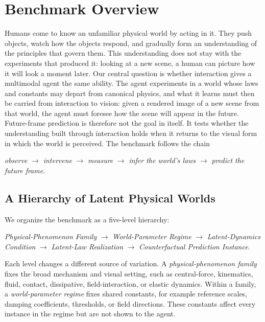 \section{Benchmark Overview}
\label{sec:benchmark}

Humans come to know an unfamiliar physical world by acting in it. They push objects, watch how the objects respond, and gradually form an understanding of the principles that govern them. This understanding does not stay with the experiments that produced it: looking at a new scene, a human can picture how it will look a moment later. Our central question is whether interaction gives a multimodal agent the same ability. The agent experiments in a world whose laws and constants may depart from canonical physics, and what it learns must then be carried from interaction to vision: given a rendered image of a new scene from that world, the agent must foresee how the scene will appear in the future. Future-frame prediction is therefore not the goal in itself. It tests whether the understanding built through interaction holds when it returns to the visual form in which the world is perceived. The benchmark follows the chain
\begin{center}
\emph{observe} $\rightarrow$ \emph{intervene} $\rightarrow$ \emph{measure}
$\rightarrow$ \emph{infer the world's laws} $\rightarrow$
\emph{predict the future frame}.
\end{center}

\subsection{A Hierarchy of Latent Physical Worlds}

We organize the benchmark as a five-level hierarchy:
\begin{center}
\textit{Physical-Phenomenon Family}
$\rightarrow$ \textit{World-Parameter Regime}
$\rightarrow$ \textit{Latent-Dynamics Condition}
$\rightarrow$ \textit{Latent-Law Realization}
$\rightarrow$ \textit{Counterfactual Prediction Instance}.
\end{center}
Each level changes a different source of variation. A \emph{physical-phenomenon family} fixes the broad mechanism and visual setting, such as central-force, kinematics, fluid, contact, dissipative, field-interaction, or elastic dynamics. Within a family, a \emph{world-parameter regime} fixes shared constants, for example reference scales, damping coefficients, thresholds, or field directions. These constants affect every instance in the regime but are not shown to the agent.

